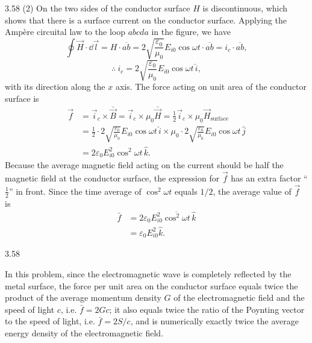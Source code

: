 \begin{solution}{3.58}
(2) On the two sides of the conductor surface $H$ is discontinuous, which shows that there is a surface current on the conductor surface. Applying the Amp\`ere circuital law to the loop $abcda$ in the figure, we have
\[
\oint\vec{H}\cdot\dd\vec{l}=H\cdot\overline{ab}
=2\sqrt{\frac{\varepsilon_0}{\mu_0}}E_{i0}\cos\omega t\cdot\overline{ab}
=i_c\cdot\overline{ab},
\]
\[
\therefore\ i_c=2\sqrt{\frac{\varepsilon_0}{\mu_0}}E_{i0}\cos\omega t\,\hat{i},
\]
with its direction along the $x$ axis. The force acting on unit area of the conductor surface is
\begin{align*}
\vec{f}&=\vec{i}_c\times\bar{\vec{B}}=\vec{i}_c\times\mu_0\bar{\vec{H}}
=\frac{1}{2}\vec{i}_c\times\mu_0\vec{H}_{\text{surface}}\\
&=\frac{1}{2}\cdot2\sqrt{\frac{\varepsilon_0}{\mu_0}}E_{i0}\cos\omega t\,\hat{i}
\times\mu_0\cdot2\sqrt{\frac{\varepsilon_0}{\mu_0}}E_{i0}\cos\omega t\,\hat{j}\\
&=2\varepsilon_0E_{i0}^2\cos^2\omega t\,\hat{k}.
\end{align*}
Because the average magnetic field acting on the current should be half the magnetic field at the conductor surface, the expression for $\vec{f}$ has an extra factor ``$\frac{1}{2}$'' in front. Since the time average of $\cos^2\omega t$ equals $1/2$, the average value of $\vec{f}$ is
\begin{align*}
\bar{f}&=2\varepsilon_0E_{i0}^2\overline{\cos^2\omega t}\,\hat{k}\\
&=\varepsilon_0E_{i0}^2\hat{k}.
\end{align*}

\begin{figbox}{3.58}
\end{figbox}

\begin{commentary}
In this problem, since the electromagnetic wave is completely reflected by the metal surface, the force per unit area on the conductor surface equals twice the product of the average momentum density $G$ of the electromagnetic field and the speed of light $c$, i.e. $\bar{f}=2Gc$; it also equals twice the ratio of the Poynting vector to the speed of light, i.e. $\bar{f}=2S/c$, and is numerically exactly twice the average energy density of the electromagnetic field.
\end{commentary}
\end{solution}

